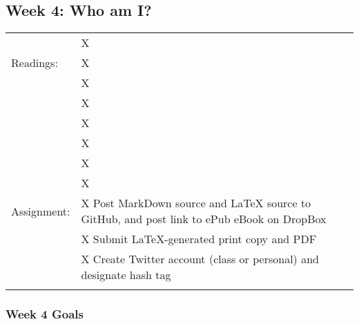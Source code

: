 \documentclass[]{article}
\begin{document}
\subsection{Week 4: Who am I?}\label{week-4-who-am-i}

\begin{longtable}[c]{@{}ll@{}}
\toprule\addlinespace
& X
\\\addlinespace
Readings: & X
\\\addlinespace
& X
\\\addlinespace
& X
\\\addlinespace
& X
\\\addlinespace
& X
\\\addlinespace
& X
\\\addlinespace
& X
\\\addlinespace
Assignment: & X Post MarkDown source and LaTeX source to GitHub, and
post link to ePub eBook on DropBox
\\\addlinespace
& X Submit LaTeX-generated print copy and PDF
\\\addlinespace
& X Create Twitter account (class or personal) and designate hash tag
\\\addlinespace
\bottomrule
\end{longtable}

\subsubsection{Week 4 Goals}\label{week-4-goals}
\end{document}
